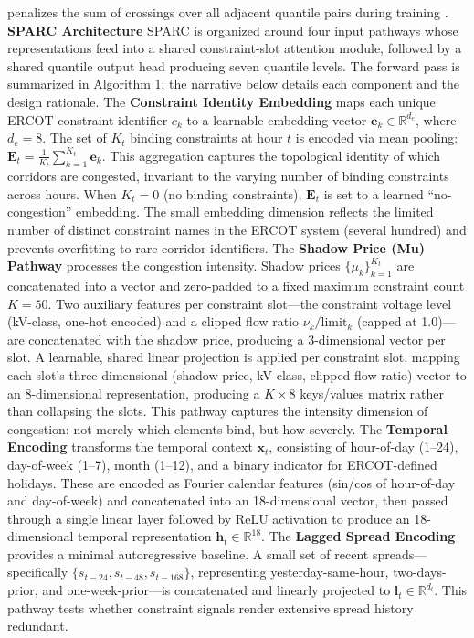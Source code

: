 \documentclass[twoside]{article}
\begin{document}
penalizes the sum of crossings over all adjacent quantile pairs during training \cite{chen2025outlieradaptivebased}.
\textbf{SPARC Architecture}
SPARC is organized around four input pathways whose representations feed into a shared constraint-slot attention module, followed by a shared quantile output head producing seven quantile levels. The forward pass is summarized in Algorithm 1; the narrative below details each component and the design rationale.
The \textbf{Constraint Identity Embedding} maps each unique ERCOT constraint identifier $c_k$ to a learnable embedding vector $\mathbf{e}_k \in \mathbb{R}^{d_e}$, where $d_e = 8$. The set of $K_t$ binding constraints at hour $t$ is encoded via mean pooling: $\mathbf{E}_t = \frac{1}{K_t} \sum_{k=1}^{K_t} \mathbf{e}_k$. This aggregation captures the topological identity of which corridors are congested, invariant to the varying number of binding constraints across hours. When $K_t = 0$ (no binding constraints), $\mathbf{E}_t$ is set to a learned ``no-congestion'' embedding. The small embedding dimension reflects the limited number of distinct constraint names in the ERCOT system (several hundred) and prevents overfitting to rare corridor identifiers.
The \textbf{Shadow Price (Mu) Pathway} processes the congestion intensity. Shadow prices $\{\mu_k\}_{k=1}^{K_t}$ are concatenated into a vector and zero-padded to a fixed maximum constraint count $K = 50$. Two auxiliary features per constraint slot---the constraint voltage level (kV-class, one-hot encoded) and a clipped flow ratio $\nu_k / \text{limit}_k$ (capped at 1.0)---are concatenated with the shadow price, producing a 3-dimensional vector per slot. A learnable, shared linear projection is applied per constraint slot, mapping each slot's three-dimensional (shadow price, kV-class, clipped flow ratio) vector to an 8-dimensional representation, producing a $K\times 8$ keys/values matrix rather than collapsing the slots. This pathway captures the intensity dimension of congestion: not merely which elements bind, but how severely.
The \textbf{Temporal Encoding} transforms the temporal context $\mathbf{x}_t$, consisting of hour-of-day (1--24), day-of-week (1--7), month (1--12), and a binary indicator for ERCOT-defined holidays. These are encoded as Fourier calendar features (sin/cos of hour-of-day and day-of-week) and concatenated into an 18-dimensional vector, then passed through a single linear layer followed by ReLU activation to produce an 18-dimensional temporal representation $\mathbf{h}_t \in \mathbb{R}^{18}$.
The \textbf{Lagged Spread Encoding} provides a minimal autoregressive baseline. A small set of recent spreads---specifically $\{s_{t-24}, s_{t-48}, s_{t-168}\}$, representing yesterday-same-hour, two-days-prior, and one-week-prior---is concatenated and linearly projected to $\mathbf{l}_t \in \mathbb{R}^{d_l}$. This pathway tests whether constraint signals render extensive spread history redundant.
\end{document}
